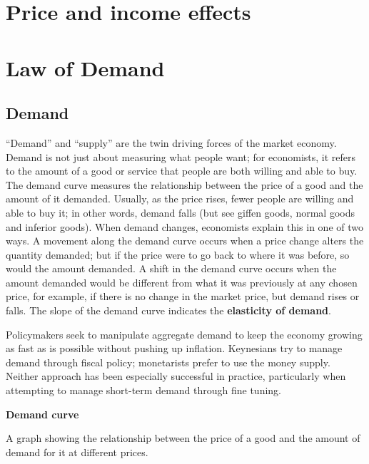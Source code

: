 \documentclass[11pt,]{book}
\theoremstyle{definition}
\theoremstyle{definition}
\theoremstyle{definition}
\theoremstyle{remark}
\begin{document}
\section{Price and income effects}\label{price-and-income-effects}

\section{Law of Demand}\label{law-of-demand}

\subsection{Demand}\label{demand}

``Demand'' and ``supply'' are the twin driving forces of the market
economy. Demand is not just about measuring what people want; for
economists, it refers to the amount of a good or service that people are
both willing and able to buy. The demand curve measures the relationship
between the price of a good and the amount of it demanded. Usually, as
the price rises, fewer people are willing and able to buy it; in other
words, demand falls (but see giffen goods, normal goods and inferior
goods). When demand changes, economists explain this in one of two ways.
A movement along the demand curve occurs when a price change alters the
quantity demanded; but if the price were to go back to where it was
before, so would the amount demanded. A shift in the demand curve occurs
when the amount demanded would be different from what it was previously
at any chosen price, for example, if there is no change in the market
price, but demand rises or falls. The slope of the demand curve
indicates the \textbf{elasticity of demand}.

Policymakers seek to manipulate aggregate demand to keep the economy
growing as fast as is possible without pushing up inflation. Keynesians
try to manage demand through fiscal policy; monetarists prefer to use
the money supply. Neither approach has been especially successful in
practice, particularly when attempting to manage short-term demand
through fine tuning.

\textbf{Demand curve}

A graph showing the relationship between the price of a good and the
amount of demand for it at different prices.
\end{document}

